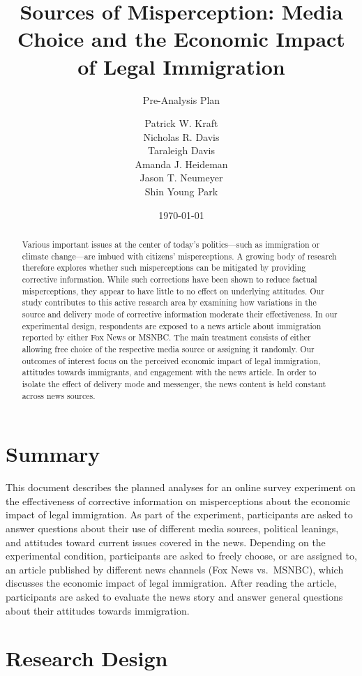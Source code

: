 \documentclass[]{article}
\title{Sources of Misperception: Media Choice and the Economic Impact
of Legal Immigration}
\subtitle{Pre-Analysis Plan}
\author{Patrick W. Kraft \\ Nicholas R. Davis \\ Taraleigh
Davis \\ Amanda J. Heideman \\ Jason T. Neumeyer \\ Shin Young Park}
\date{\today}
\begin{document}
\maketitle
\begin{abstract}
Various important issues at the center of today's politics---such as
immigration or climate change---are imbued with citizens'
misperceptions. A growing body of research therefore explores whether
such misperceptions can be mitigated by providing corrective
information. While such corrections have been shown to reduce factual
misperceptions, they appear to have little to no effect on underlying
attitudes. Our study contributes to this active research area by
examining how variations in the source and delivery mode of corrective
information moderate their effectiveness. In our experimental design,
respondents are exposed to a news article about immigration reported by
either Fox News or MSNBC. The main treatment consists of either allowing
free choice of the respective media source or assigning it randomly. Our
outcomes of interest focus on the perceived economic impact of legal
immigration, attitudes towards immigrants, and engagement with the news
article. In order to isolate the effect of delivery mode and messenger,
the news content is held constant across news sources.
\end{abstract}

\hypertarget{summary}{%
\section{Summary}\label{summary}}

This document describes the planned analyses for an online survey
experiment on the effectiveness of corrective information on
misperceptions about the economic impact of legal immigration. As part
of the experiment, participants are asked to answer questions about
their use of different media sources, political leanings, and attitudes
toward current issues covered in the news. Depending on the experimental
condition, participants are asked to freely choose, or are assigned to,
an article published by different news channels (Fox News vs.~MSNBC),
which discusses the economic impact of legal immigration. After reading
the article, participants are asked to evaluate the news story and
answer general questions about their attitudes towards immigration.

\hypertarget{research-design}{%
\section{Research Design}\label{research-design}}
\end{document}
